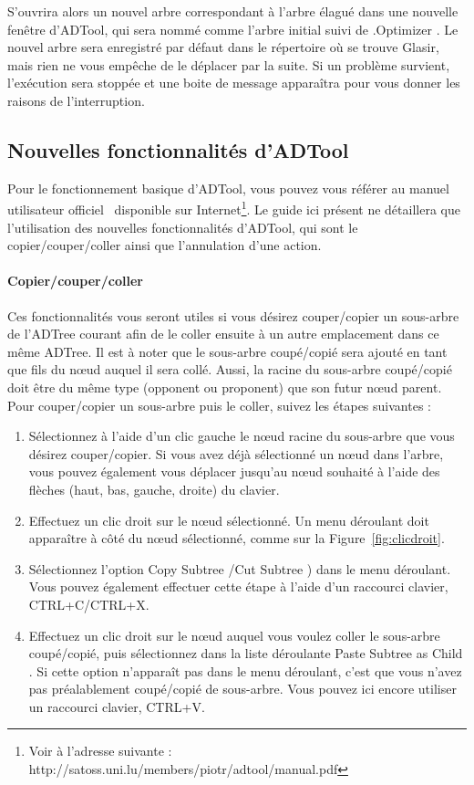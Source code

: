 S'ouvrira alors un nouvel arbre correspondant à l'arbre élagué dans une nouvelle fenêtre d'ADTool, qui sera nommé comme l'arbre initial suivi de \og .Optimizer \fg{}. Le nouvel arbre sera enregistré par défaut dans le répertoire où se trouve Glasir, mais rien ne vous empêche de le déplacer par la suite.
Si un problème survient, l'exécution sera stoppée et une boite de message apparaîtra pour vous donner les raisons de l'interruption.

\subsection{Nouvelles fonctionnalités d'ADTool}
\label{ssec:manuelADTool}

Pour le fonctionnement basique d'ADTool, vous pouvez vous référer au manuel utilisateur officiel~\cite{ADTool_Manual} disponible sur Internet\footnote{Voir à l'adresse suivante : http://satoss.uni.lu/members/piotr/adtool/manual.pdf}. Le guide ici présent ne détaillera que l'utilisation des nouvelles fonctionnalités d'ADTool, qui sont le copier/couper/coller ainsi que l'annulation d'une action.

\paragraph{Copier/couper/coller} Ces fonctionnalités vous seront utiles si vous désirez couper/copier un sous-arbre de l'ADTree courant afin de le coller ensuite à un autre emplacement dans ce même ADTree. Il est à noter que le sous-arbre coupé/copié sera ajouté en tant que fils du n\oe{}ud auquel il sera collé. Aussi, la racine du sous-arbre coupé/copié doit être du même type (opponent ou proponent) que son futur n\oe{}ud parent. Pour couper/copier un sous-arbre puis le coller, suivez les étapes suivantes : 
\begin{enumerate}
    \item Sélectionnez à l'aide d'un clic gauche le n\oe{}ud racine du sous-arbre que vous désirez couper/copier. Si vous avez déjà sélectionné un n\oe{}ud dans l'arbre, vous pouvez également vous déplacer jusqu'au n\oe{}ud souhaité à l'aide des flèches (haut, bas, gauche, droite) du clavier.
	\item Effectuez un clic droit sur le n\oe{}ud sélectionné. Un menu déroulant doit apparaître à côté du n\oe{}ud sélectionné, comme sur la {\sc Figure}~\ref{fig:clicdroit}.
	\item Sélectionnez l'option \og Copy Subtree \fg{}/\og Cut Subtree \fg{}) dans le menu déroulant. Vous pouvez également effectuer cette étape à l'aide d'un raccourci clavier, {\sc CTRL+C}/{\sc CTRL+X}.
	\item Effectuez un clic droit sur le n\oe{}ud auquel vous voulez coller le sous-arbre coupé/copié, puis sélectionnez dans la liste déroulante \og Paste Subtree as Child \fg{}. Si cette option n'apparaît pas dans le menu déroulant, c'est que vous n'avez pas préalablement coupé/copié de sous-arbre. Vous pouvez ici encore utiliser un raccourci clavier, {\sc CTRL+V}.
\end{enumerate}

